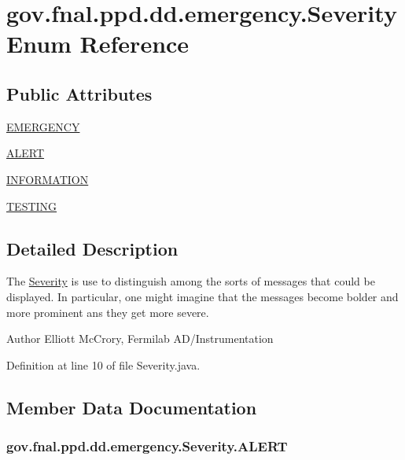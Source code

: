 \hypertarget{enumgov_1_1fnal_1_1ppd_1_1dd_1_1emergency_1_1Severity}{\section{gov.\-fnal.\-ppd.\-dd.\-emergency.\-Severity Enum Reference}
\label{enumgov_1_1fnal_1_1ppd_1_1dd_1_1emergency_1_1Severity}
}
\subsection*{Public Attributes}
\begin{DoxyCompactItemize}
\item 
\hyperlink{enumgov_1_1fnal_1_1ppd_1_1dd_1_1emergency_1_1Severity_a611bc0cf1463a7419a9d2cd14c683578}{E\-M\-E\-R\-G\-E\-N\-C\-Y}
\item 
\hyperlink{enumgov_1_1fnal_1_1ppd_1_1dd_1_1emergency_1_1Severity_ab2b0f7c4e6222e22432f49393a71091c}{A\-L\-E\-R\-T}
\item 
\hyperlink{enumgov_1_1fnal_1_1ppd_1_1dd_1_1emergency_1_1Severity_aaf755550765aa7e569baf503397ecd12}{I\-N\-F\-O\-R\-M\-A\-T\-I\-O\-N}
\item 
\hyperlink{enumgov_1_1fnal_1_1ppd_1_1dd_1_1emergency_1_1Severity_ac5e5ede059fb831322252943bb24a7d5}{T\-E\-S\-T\-I\-N\-G}
\end{DoxyCompactItemize}


\subsection{Detailed Description}
The \hyperlink{enumgov_1_1fnal_1_1ppd_1_1dd_1_1emergency_1_1Severity}{Severity} is use to distinguish among the sorts of messages that could be displayed. In particular, one might imagine that the messages become bolder and more prominent ans they get more severe.

\begin{DoxyAuthor}{Author}
Elliott Mc\-Crory, Fermilab A\-D/\-Instrumentation 
\end{DoxyAuthor}


Definition at line 10 of file Severity.\-java.



\subsection{Member Data Documentation}
\hypertarget{enumgov_1_1fnal_1_1ppd_1_1dd_1_1emergency_1_1Severity_ab2b0f7c4e6222e22432f49393a71091c}{
\subsubsection[{A\-L\-E\-R\-T}]{\setlength{\rightskip}{0pt plus 5cm}gov.\-fnal.\-ppd.\-dd.\-emergency.\-Severity.\-A\-L\-E\-R\-T}}\label{enumgov_1_1fnal_1_1ppd_1_1dd_1_1emergency_1_1Severity_ab2b0f7c4e6222e22432f49393a71091c}


